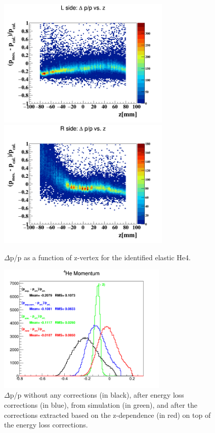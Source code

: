 \begin{figure}[tbp]
\includegraphics[height=6.2cm]{fig/delta_p_z_elastic_l.png}
\includegraphics[height=6.2cm]{fig/delta_p_z_elastic_r.png}
\caption{$\Delta$p/p as a function of z-vertex for the identified elastic He4.}
\label{fig:delta_p_z}
\end{figure}

\begin{figure}[tbp]
   \centering
   \includegraphics[height=6.2cm]{fig/P_diff_z_correction.png}
   \caption{$\Delta$p/p without any corrections (in black), after energy loss 
   corrections (in blue), from simulation (in green), and after the corrections 
extracted based on the z-dependence (in red) on top of the energy loss 
corrections.}
   \label{fig:P_diff_z_correction}
\end{figure}


